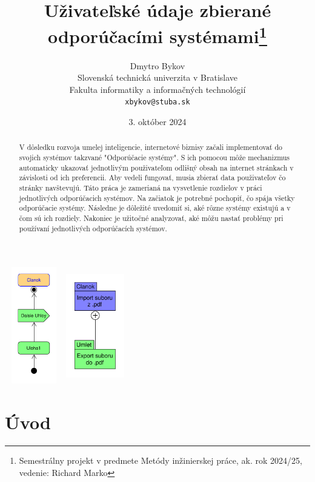 \documentclass[10pt,twocolumn,twoside,slovak,a4paper]{article}
\title{Uživateľské údaje zbierané odporúčacími systémami\thanks{Semestrálny projekt v predmete Metódy inžinierskej práce, ak. rok 2024/25, vedenie: Richard Marko}} %
\author{Dmytro Bykov\\[2pt]
	{\small Slovenská technická univerzita v Bratislave}\\
	{\small Fakulta informatiky a informačných technológií}\\
	{\small \texttt{xbykov@stuba.sk}}
	}
\date{\small 3. október 2024} %
\begin{document}
\maketitle
\begin{abstract}
V dôsledku rozvoja umelej inteligencie, internetové biznisy začali implementovať do svojich systémov takzvané "Odporúčacie systémy". S ich pomocou môže mechanizmus automaticky ukazovať jednotlivým použivateľom odlišný obsah na internet stránkach v závislosti od ich preferencii. Aby vedeli fungovať, musia zbierať data použivateľov čo stránky navštevujú. Táto práca je zamerianá na vysvetlenie rozdielov v práci jednotlivých odporúčacich systémov.
Na začiatok je potrebné pochopiť, čo spája všetky odporúčacie systémy. Následne je dôležité uvedomiť si, aké rôzne systémy existujú a v čom sú ich rozdiely. Nakoniec je užitočné analyzovať, aké môžu nastať problémy pri používaní jednotlivých odporúčacích systémov.
\end{abstract}


\includegraphics[height =2in,width=1in, angle = 90]{progres_mip.pdf}
\includegraphics[height =2in,width=1in]{diagram_2.pdf}

\section{Úvod}
\end{document}
